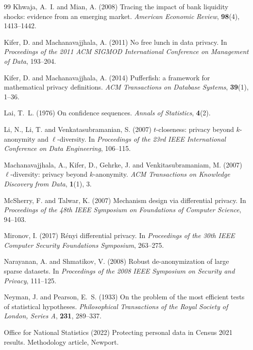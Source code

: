 \documentclass[11pt,a4paper]{article}
\theoremstyle{plain}
\theoremstyle{definition}
\begin{document}
\begin{thebibliography}{99}
Khwaja, A.~I. and Mian, A. (2008) Tracing the impact of bank liquidity shocks:
evidence from an emerging market. \emph{American Economic Review},
\textbf{98}(4), 1413--1442.

Kifer, D. and Machanavajjhala, A. (2011) No free lunch in data privacy. In
\emph{Proceedings of the 2011 ACM SIGMOD International Conference on Management
of Data}, 193--204.

Kifer, D. and Machanavajjhala, A. (2014) Pufferfish: a framework for
mathematical privacy definitions. \emph{ACM Transactions on Database Systems},
\textbf{39}(1), 1--36.

Lai, T.~L. (1976) On confidence sequences. \emph{Annals of Statistics},
\textbf{4}(2).

Li, N., Li, T. and Venkatasubramanian, S. (2007) $t$-closeness: privacy beyond
$k$-anonymity and $\ell$-diversity. In \emph{Proceedings of the 23rd IEEE
International Conference on Data Engineering}, 106--115.

Machanavajjhala, A., Kifer, D., Gehrke, J. and Venkitasubramaniam, M. (2007)
$\ell$-diversity: privacy beyond $k$-anonymity. \emph{ACM Transactions on
Knowledge Discovery from Data}, \textbf{1}(1), 3.

McSherry, F. and Talwar, K. (2007) Mechanism design via differential privacy.
In \emph{Proceedings of the 48th IEEE Symposium on Foundations of Computer
Science}, 94--103.

Mironov, I. (2017) R\'enyi differential privacy. In \emph{Proceedings of the 30th
IEEE Computer Security Foundations Symposium}, 263--275.

Narayanan, A. and Shmatikov, V. (2008) Robust de-anonymization of large sparse
datasets. In \emph{Proceedings of the 2008 IEEE Symposium on Security and
Privacy}, 111--125.

Neyman, J. and Pearson, E.~S. (1933) On the problem of the most efficient tests
of statistical hypotheses. \emph{Philosophical Transactions of the Royal
Society of London, Series A}, \textbf{231}, 289--337.

Office for National Statistics (2022) Protecting personal data in Census 2021
results. Methodology article, Newport.


\end{thebibliography}
\end{document}
